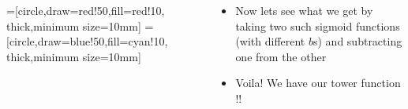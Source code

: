 \documentclass[aspectratio=169]{beamer}
\begin{document}
\begin{frame}
\begin{columns}
\begin{overlayarea}{\textwidth}{\textheight}

=[circle,draw=red!50,fill=red!10, thick,minimum size=10mm]
=[circle,draw=blue!50,fill=cyan!10, thick,minimum size=10mm]
\end{overlayarea}


\begin{overlayarea}{\textwidth}{\textheight}
\begin{itemize}
\item Now lets see what we get by taking two such sigmoid functions (with different $b$s) and subtracting one from the other
\item<4-> Voila! We have our tower function !!
\end{itemize}
\end{overlayarea}
\end{columns}
\end{frame}
\end{document}
